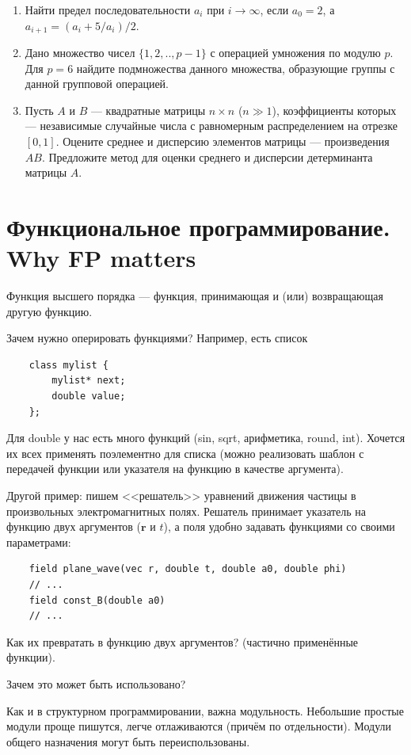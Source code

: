 \documentclass{book}
\begin{document}
\begin{enumerate}
    \item Найти предел последовательности $a_i$ при $i \to \infty$, если $a_0 = 2$, а $a_{i + 1} =
        (a_i + 5 / a_i) / 2$.
    \item Дано множество чисел $\{1,2,..,p - 1\}$ с операцией умножения по модулю $p$.
        Для $p = 6$ найдите подмножества данного множества, образующие группы с данной групповой
        операцией.
    \item  Пусть $A$ и $B$ --- квадратные матрицы $n \times n$ ($n \gg 1$),
        коэффициенты которых --- независимые случайные числа с равномерным распределением на
        отрезке $[0, 1]$. Оцените среднее и дисперсию элементов матрицы --- произведения $A B$.
        Предложите метод для оценки среднего и дисперсии детерминанта матрицы $A$.
\end{enumerate}

\section{Функциональное программирование. Why FP matters}

Функция высшего порядка --- функция, принимающая и (или) возвращающая другую функцию.

Зачем нужно оперировать функциями? Например, есть список
\begin{verbatim}
    class mylist {
        mylist* next;
        double value;
    };
\end{verbatim}
Для double у нас есть много функций (sin, sqrt, арифметика, round, int). Хочется их всех применять
поэлементно для списка (можно реализовать шаблон с передачей функции или указателя на функцию в
качестве аргумента).

Другой пример: пишем <<решатель>> уравнений движения частицы в произвольных электромагнитных полях.
Решатель принимает указатель на функцию двух аргументов ($\mathbf r$ и $t$), а поля удобно задавать
функциями со своими параметрами:
\begin{verbatim}
    field plane_wave(vec r, double t, double a0, double phi)
    // ...
    field const_B(double a0)
    // ...
\end{verbatim}
Как их превратать в функцию двух аргументов? (частично применённые функции).

Зачем это может быть использовано?

Как и в структурном программировании, важна модульность. Небольшие простые модули проще пишутся,
легче отлаживаются (причём по отдельности). Модули общего назначения могут быть переиспользованы. 
\end{document}
